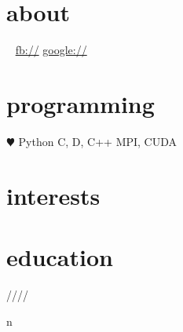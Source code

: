 \documentclass[]{fancy-cv}
\begin{document}
\header{\myfirstname}{\mylastname}
       {\mytitle}

\begin{aside}
  \section{about}
    \myaddress
    \mycity
    ~
    \href{mailto:\myemail}{\myemail}
    \href{\mywebsite}{\mywebsite}
    \href{http://facebook.com/\myfb}{fb://\myfb}
    \href{http://plug.google.com/\mygp}{google://\mygp}
  \section{programming}
    {\color{red} $\varheartsuit$} Python
    C, D, C++
    MPI, CUDA
\end{aside}

\section{interests}
\interests

\section{education}
\label{sec:education}

\begin{entrylist}
 \year/\degree/\school/\city/\subtitle in \education {
  \entry{\year}{\degree}{\school}{\subtitle}
}
\end{entrylist}
\end{document}
